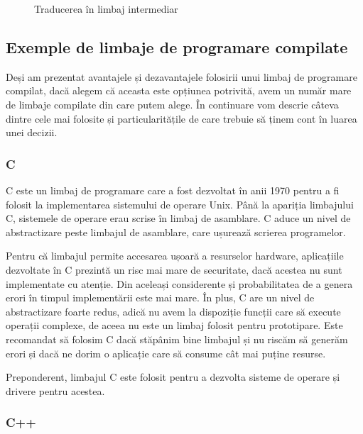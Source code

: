 \begin{figure}[htbp]
  \centering
  \def\svgwidth{0.6\columnwidth}
  
  \caption{Traducerea în limbaj intermediar}
  \label{fig:appdev:intermediary}
\end{figure}

\subsection{Exemple de limbaje de programare compilate}
\label{sec:appdev:compiled-lang:ex}

Deși am prezentat avantajele și dezavantajele folosirii unui limbaj de
programare compilat, dacă alegem că aceasta este opțiunea potrivită, avem un
număr mare de limbaje compilate din care putem alege. În continuare vom descrie
câteva dintre cele mai folosite și particularitățile de care trebuie să ținem cont
în luarea unei decizii.

\subsubsection{C}
\label{sec:appdev:compiled-lang:c}

C este un limbaj de programare care a fost dezvoltat în anii 1970 pentru a fi
folosit la implementarea sistemului de operare Unix. Până la apariția limbajului
C, sistemele de operare erau scrise în limbaj de asamblare. C aduce un nivel de
abstractizare peste limbajul de asamblare, care ușurează scrierea programelor.

Pentru că limbajul permite accesarea ușoară a resurselor hardware, aplicațiile
dezvoltate în C prezintă un risc mai mare de securitate, dacă acestea nu sunt implementate cu
atenție. Din aceleași considerente și probabilitatea de a genera erori în timpul
implementării este mai mare. În plus, C are un nivel de abstractizare foarte
redus, adică nu avem la dispoziție funcții care să execute operații complexe, de
aceea nu este un limbaj folosit pentru prototipare. Este recomandat să folosim C
dacă stăpânim bine limbajul și nu riscăm să generăm erori și dacă ne dorim o
aplicație care să consume cât mai puține resurse.

Preponderent, limbajul C este folosit pentru a dezvolta sisteme de operare și
drivere pentru acestea.

\subsubsection{C++}
\label{sec:appdev:compiled-lang:cpp}

